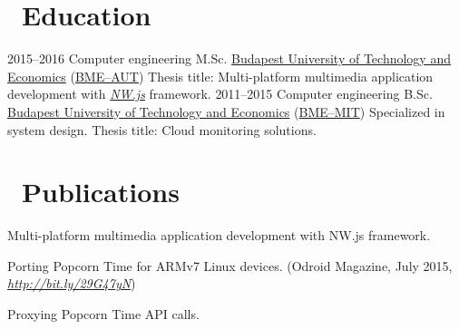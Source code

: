 \documentclass[hidelinks,11pt]{friggeri-cv}
\def\book{{\FA \faBook}}
\def\pencil{{\FA \faPencil}}
\begin{document}
\section{{\pencil}\ Education}
\begin{entrylist}
  \entry
    {2015--2016}
    {{\normalfont Computer engineering M.Sc.}}
    {\href{http://www.bme.hu/?language=en}{Budapest University of Technology and Economics}
    (\href{https://www.aut.bme.hu/en/default.aspx}{BME--AUT})}
    {Thesis title: Multi-platform multimedia application development with
    \textit{\href{https://nwjs.io/}{NW.js}} framework.}
  \entry
    {2011--2015}
    {{\normalfont Computer engineering B.Sc.}}
    {\href{http://www.bme.hu/?language=en}{Budapest University of Technology and Economics}
    (\href{http://www.mit.bme.hu/eng/}{BME--MIT})}
    {Specialized in system design. Thesis title: Cloud monitoring solutions.}
\end{entrylist}

\section{{\book}\ Publications}
Multi-platform multimedia application development with NW.js framework.

Porting Popcorn Time for ARMv7 Linux devices.
{\small (Odroid Magazine, July 2015, \textit{\href{http://bit.ly/29G47yN}{http://bit.ly/29G47yN}})}

Proxying Popcorn Time API calls.

\newpage
\end{document}

